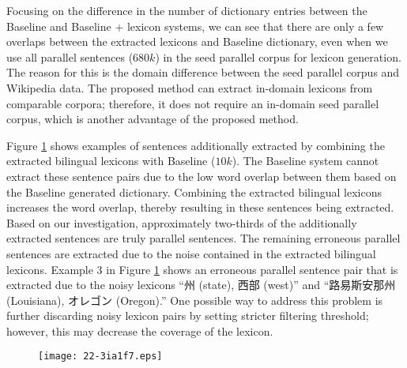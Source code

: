 \documentclass[english]{jnlp_1.4}
\begin{document}
Focusing on the difference in the number of dictionary entries between the Baseline and Baseline + 
lexicon systems, we can see that there are only a few overlaps between the extracted lexicons and 
Baseline dictionary, even when we use all parallel sentences ($680k$) in the seed parallel corpus for 
lexicon generation. The reason for this is the domain difference between the seed parallel corpus 
and Wikipedia data. The proposed method can extract in-domain lexicons from comparable corpora; 
therefore, it does not require an in-domain seed parallel corpus, which is another advantage of the proposed method.

Figure \ref{sentence_fig:examples} shows examples of sentences additionally extracted by combining 
the extracted bilingual lexicons with Baseline ($10k$). The Baseline system cannot extract these sentence 
pairs due to the low word overlap between them based on the Baseline generated dictionary. Combining 
the extracted bilingual lexicons increases the word overlap, thereby resulting in these sentences being 
extracted. Based on our investigation, approximately two-thirds of the additionally extracted sentences 
are truly parallel sentences. The remaining erroneous parallel sentences are extracted due to the noise 
contained in the extracted bilingual lexicons. Example 3 in Figure \ref{sentence_fig:examples} shows an erroneous parallel sentence 
pair that is extracted due to the noisy lexicons ``州 (state), 西部 (west)'' and ``路易斯安那州 (Louisiana), 
オレゴン (Oregon).'' One possible way to address this problem is further discarding noisy lexicon pairs by 
setting stricter filtering threshold; however, this may decrease the coverage of the lexicon.

\begin{figure}[t]
\begin{center}
\texttt{[image: 22-3ia1f7.eps]}
\end{center}
\label{sentence_fig:examples}
\end{figure}
\end{document}
